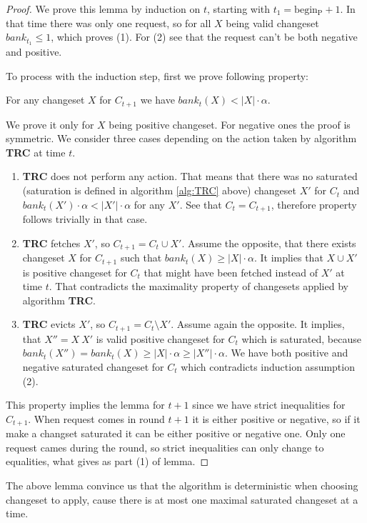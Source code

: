 \begin{proof}
We prove this lemma by induction on $t$, starting with $t_1 = \mathrm{begin_P} 
+1$. In 
that time there was only one request, so for all $X$ being valid changeset 
$bank_{t_1} \leq 1$, which proves (1). For (2) see that the request can't be 
both negative and positive.

To process with the induction step, first we prove following property:
\begin{property}
For any changeset $X$ for $C_{t+1}$ we have $bank_t(X) < |X| \cdot \alpha$.
\end{property}
We prove it only for $X$ being positive changeset. For negative ones the proof 
is symmetric. We consider three cases depending on the action taken by 
algorithm \textbf{TRC} at time $t$.
\begin{enumerate}
 \item \textbf{TRC} does not perform any action. That means that there was no 
saturated (saturation is defined in algorithm \ref{alg:TRC} above) changeset 
$X'$ for $C_t$ and $bank_t(X') \cdot \alpha < |X'| \cdot \alpha$ for any $X'$. 
See that $C_t = 
C_{t+1}$, therefore property follows trivially in that case.
  \item \textbf{TRC} fetches $X'$, so $C_{t+1} = C_t \cup X'$. Assume the 
opposite, that there exists changeset $X$ for $C_{t+1}$ such that $bank_t(X) 
\geq |X| \cdot \alpha$. It implies that $X \cup X'$ is positive changeset for 
$C_t$ that might have been fetched instead of $X'$ at time $t$. That 
contradicts the maximality property of changesets applied by algorithm 
\textbf{TRC}.
  \item \textbf{TRC} evicts $X'$, so $C_{t+1}  = C_t \setminus X'$. Assume 
again the opposite. It implies, that $X'' = X \ X'$ is valid 
positive changeset for $C_t$ which is saturated, because $bank_t(X'') = 
bank_t(X) \geq |X| \cdot \alpha \geq |X''| \cdot \alpha$. We have both positive 
and negative saturated changeset for $C_t$ which contradicts induction 
assumption (2).
\end{enumerate}
This property implies the lemma for $t+1$ since we have strict inequalities for 
$C_{t+1}$. When request comes in round $t+1$ it is either positive or negative, 
so if it make a changset saturated it can be either positive or negative one. 
Only one request cames during the round, so strict inequalities can only change 
to equalities, what gives as part (1) of lemma.
\end{proof}
The above lemma convince us that the algorithm is deterministic when choosing 
changeset to apply, cause there is at most one maximal saturated changeset at a 
time.

